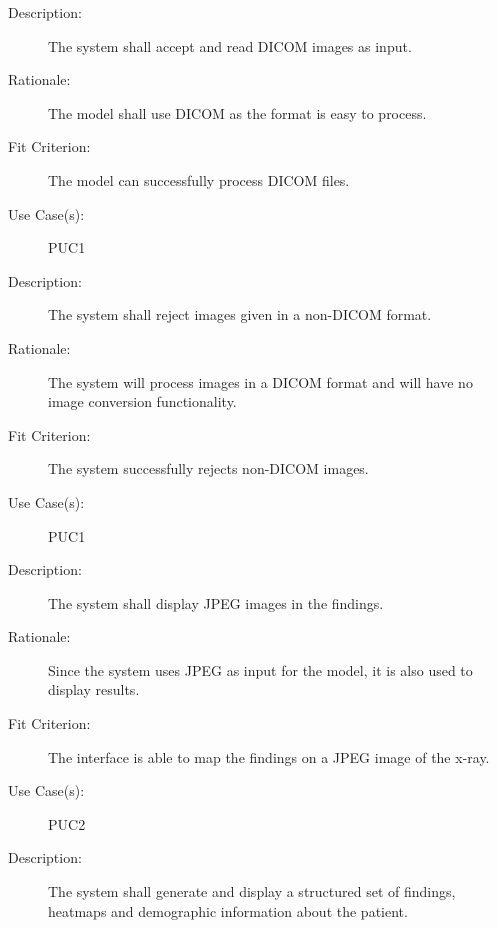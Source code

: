 \documentclass[12pt]{article}
\begin{document}
\begin{enumerate}[label=FR\arabic*., series=frs]
    \begin{item}
        \begin{description}
            \item[Description:] The system shall accept and read DICOM images as input.
            \item[Rationale:] The model shall use DICOM as the format is easy to process.
            \item[Fit Criterion:] The model can successfully process DICOM files.
            \item[Use Case(s):] PUC1
        \end{description}
    \end{item}
    \begin{item}
        \begin{description}
            \item[Description:] The system shall reject images given in a non-DICOM format.
            \item[Rationale:] The system will process images in a DICOM format and will have no image conversion functionality.
            \item[Fit Criterion:] The system successfully rejects non-DICOM images.
            \item[Use Case(s):] PUC1
        \end{description}
    \end{item}
    \begin{item}
        \begin{description}
            \item[Description:] The system shall display JPEG images in the findings.
            \item[Rationale:] Since the system uses JPEG as input for the model, it is also used to display results.
            \item[Fit Criterion:] The interface is able to map the findings on a JPEG image of the x-ray.
            \item[Use Case(s):] PUC2
        \end{description}
    \end{item}
    \begin{item}
        \begin{description}
            \item[Description:] The system shall generate and display a structured set of findings, heatmaps and demographic information about the patient.

\end{description}
\end{item}
\end{enumerate}
\end{document}
